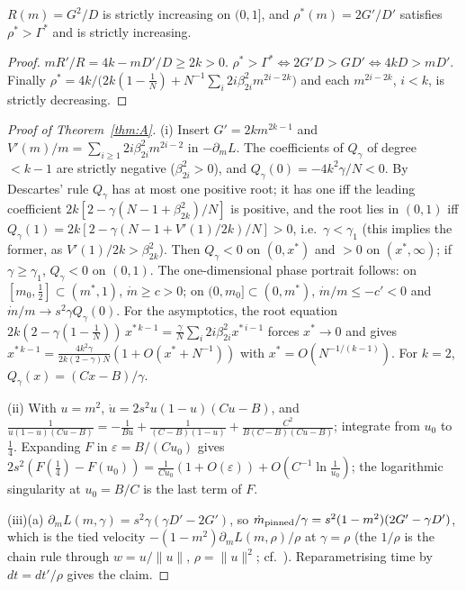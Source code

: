 \begin{lemma}\label{lem:mono}
$R(m)=G^2/D$ is strictly increasing on $(0,1]$, and $\rho^*(m)=2G'/D'$ satisfies $\rho^*>\Gamma^*$ and is strictly increasing.
\end{lemma}
\begin{proof}
$mR'/R=4k-mD'/D\ge2k>0$. $\rho^*>\Gamma^*\iff2G'D>GD'\iff4kD>mD'$. Finally $\rho^*=4k/\big(2k(1-\frac1N)+N^{-1}\sum_i2i\beta_{2i}^2m^{2i-2k}\big)$ and
each $m^{2i-2k}$, $i<k$, is strictly decreasing.
\end{proof}

\begin{proof}[Proof of Theorem~\ref{thm:A}]
(i) Insert $G'=2km^{2k-1}$ and $V'(m)/m=\sum_{i\ge1}2i\beta_{2i}^2m^{2i-2}$ in $-\partial_mL$. The coefficients of $Q_\gamma$ of
degree $<k-1$ are strictly negative ($\beta_{2i}^2>0$), and $Q_\gamma(0)=-4k^2\gamma/N<0$. By Descartes' rule $Q_\gamma$ has at most one positive root;
it has one iff the leading coefficient $2k[2-\gamma(N-1+\beta_{2k}^2)/N]$ is positive, and the root lies in $(0,1)$ iff
$Q_\gamma(1)=2k[2-\gamma(N-1+V'(1)/2k)/N]>0$, i.e.\ $\gamma<\gamma_1$ (this implies the former, as $V'(1)/2k>\beta_{2k}^2$). Then $Q_\gamma<0$ on $(0,x^*)$ and $>0$ on $(x^*,\infty)$; if $\gamma\ge\gamma_1$, $Q_\gamma<0$ on
$(0,1)$. The one-dimensional phase portrait follows: on $[m_0,\frac12]\subset(m^*,1)$, $\dot m\ge c>0$; on $(0,m_0]\subset(0,m^*)$, $\dot m/m\le-c'<0$ and
$\dot m/m\to s^2\gamma Q_\gamma(0)$. For the asymptotics, the root equation $2k(2-\gamma(1-\frac1N))\,x^{*\,k-1}=\frac{\gamma}{N}\sum_i2i\beta_{2i}^2x^{*\,i-1}$ forces $x^*\to0$
and gives $x^{*\,k-1}=\frac{4k^2\gamma}{2k(2-\gamma)N}(1+O(x^*+N^{-1}))$ with $x^*=O(N^{-1/(k-1)})$. For $k=2$, $Q_\gamma(x)=(C x-B)/\gamma$.

(ii) With $u=m^2$, $\dot u=2s^2u(1-u)(Cu-B)$, and $\frac1{u(1-u)(Cu-B)}=-\frac1{Bu}+\frac1{(C-B)(1-u)}+\frac{C^2}{B(C-B)(Cu-B)}$; integrate from
$u_0$ to $\frac14$. Expanding $F$ in $\varepsilon=B/(Cu_0)$ gives $2s^2(F(\frac14)-F(u_0))=\frac1{Cu_0}(1+O(\varepsilon))+O(C^{-1}\ln\frac1{u_0})$; the
logarithmic singularity at $u_0=B/C$ is the last term of $F$.

(iii)(a) $\partial_mL(m,\gamma)=s^2\gamma(\gamma D'-2G')$, so $\dot m_{\rm pinned}/\gamma=s^2(1-m^2)(2G'-\gamma D')$, which is the tied velocity
$-(1-m^2)\partial_mL(m,\rho)/\rho$ at $\gamma=\rho$ (the $1/\rho$ is the chain rule through $w=u/\|u\|$, $\rho=\|u\|^2$;
cf.\ \citealp[Lemma~B.1]{ren2025emergence}). Reparametrising time by $dt=dt'/\rho$ gives the claim.


\end{proof}
